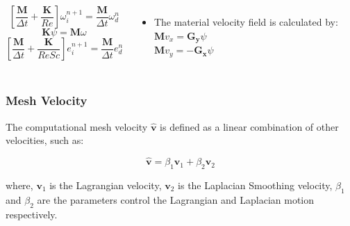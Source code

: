 \begin{frame}
\begin{columns}[c]
\vspace{-1cm}
\begin{center}
\begin{equation*}
 \left[ \frac{\mathbf{M}}{\Delta t} + \frac{\mathbf{K}}{Re} \right] \omega_{i}^{n+1} = \frac{\mathbf{M}}{\Delta t} \omega_{d}^{n}
\end{equation*}
\medskip
\begin{equation*}
 \mathbf{K} \psi = \mathbf{M} \omega
\end{equation*}
\medskip
\begin{equation*}
 \left[ \frac{\mathbf{M}}{\Delta t} + \frac{\mathbf{K}}{ReSc} \right] e_{i}^{n+1} = \frac{\mathbf{M}}{\Delta t} e_{d}^{n}
\end{equation*}
\end{center}

\vspace{0.5cm}
\begin{itemize}
\justifying
\item The material velocity field is calculated by: \\
$\mathbf{M} v_{x} = \mathbf{G_{y}} \psi$\\
$\mathbf{M} v_{y} = - \mathbf{G_{x}} \psi$
\end{itemize}
\end{columns}

\end{frame}





\begin{frame}
 \frametitle{\LARGE Mesh Velocity}

\vspace{-1.5cm}
\justifying
The computational mesh velocity $\mathbf{\hat{v}}$ is defined as
a linear combination of other velocities, such as:

\vspace{1cm}
\begin{equation*}
\mathbf{\hat{v}} = \beta_{1}\textbf{v}_{1} + \beta_{2}\textbf{v}_{2}
\end{equation*}

\vspace{1cm}
where,
$\mathbf{v}_{1}$ is the Lagrangian velocity,
$\mathbf{v}_{2}$ is the Laplacian Smoothing velocity,
$\beta_{1}$ and $\beta_{2}$ are 
the parameters control the Lagrangian and Laplacian motion respectively.

\end{frame}






